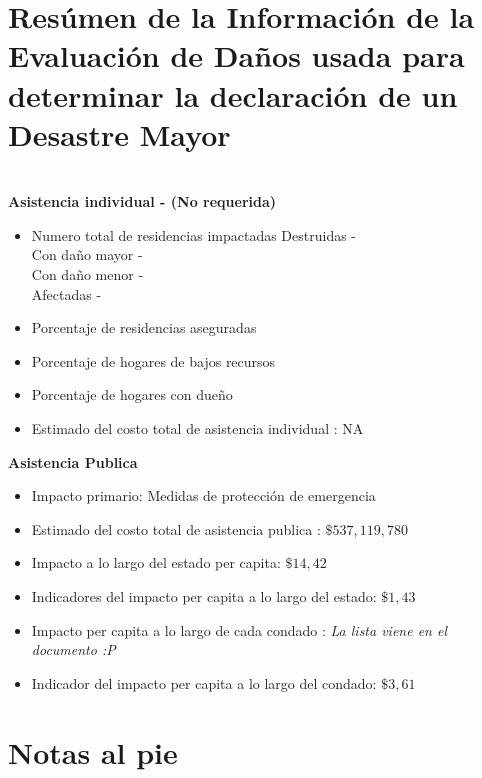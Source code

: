 \documentclass[
10pt, %
spanish,
a4paper, %
twocolumn, %
landscape %
]{article}
\begin{document}
\section*{Resúmen de la Información de la Evaluación de Daños usada para determinar la declaración de un Desastre Mayor}\\ %

\textbf{Asistencia individual - (No requerida)}\\

\begin{itemize}
\item Numero total de residencias impactadas
Destruidas -\\
Con daño mayor - \\
Con daño menor - \\
Afectadas -\\
\item Porcentaje de residencias aseguradas
\item Porcentaje de hogares de bajos recursos
\item Porcentaje de hogares con dueño 
\item Estimado del costo total de asistencia individual : NA
\end{itemize}

\textbf{Asistencia Publica}

\begin{itemize}
\item Impacto primario: Medidas de protección de emergencia
\item Estimado del costo total de asistencia publica : $\$ 537,119,780$
\item Impacto a lo largo del estado per capita: $\$14,42$
\item Indicadores del impacto per capita a lo largo del estado: $\$1,43$
\item Impacto per capita a lo largo de cada condado : \textit{La lista viene en el documento :P}
\item Indicador del impacto per capita a lo largo del condado: $\$3,61$
\end{itemize}

\section*{Notas al pie}
\end{document}

